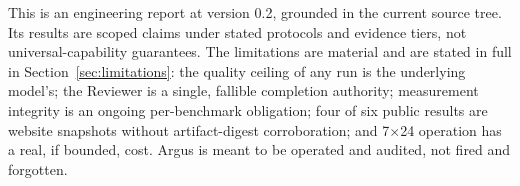 \begin{callout}
This is an engineering report at version 0.2, grounded in the current source
tree. Its results are scoped claims under stated protocols and evidence tiers,
not universal-capability guarantees. The limitations are material and are stated
in full in Section~\ref{sec:limitations}: the quality ceiling of any run is the
underlying model's; the Reviewer is a single, fallible completion authority;
measurement integrity is an ongoing per-benchmark obligation; four of six public
results are website snapshots without artifact-digest corroboration; and
7$\times$24 operation has a real, if bounded, cost. Argus is meant to be
operated and audited, not fired and forgotten.
\end{callout}
